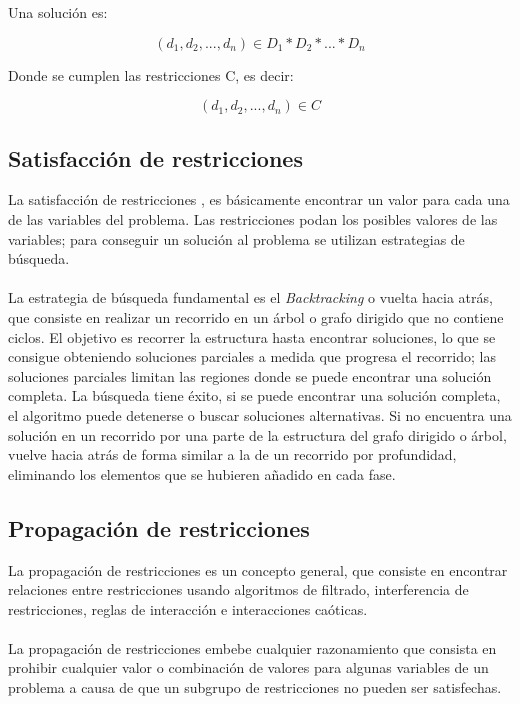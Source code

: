 Una solución es:

$$(d_{1},d_{2},...,d_{n}) \in D_{1}*D_{2}*...*D_{n}$$

Donde se cumplen las restricciones C, es decir:

$$(d_{1},d_{2},...,d_{n}) \in C $$

\subsection{Satisfacci\'on de restricciones}

La satisfacción de restricciones \cite{Francesca}, es básicamente encontrar un valor para cada una de las variables del problema. Las restricciones podan los posibles valores de las variables; para conseguir un solución al problema se utilizan estrategias de búsqueda.
\\ \\
La estrategia de búsqueda fundamental es el \textit{Backtracking} o vuelta hacia atrás, que consiste en realizar un recorrido en un árbol o grafo dirigido que no contiene ciclos. El objetivo es recorrer la estructura hasta encontrar soluciones, lo que se consigue obteniendo soluciones parciales a medida que progresa el recorrido; las soluciones parciales limitan las regiones donde se puede encontrar una solución completa. La búsqueda tiene éxito, si se puede encontrar una solución completa, el algoritmo puede detenerse o buscar soluciones alternativas. Si no encuentra una solución en un recorrido por una parte de la estructura del grafo dirigido o árbol, vuelve hacia atrás de forma similar a la de un recorrido por profundidad, eliminando los elementos que se hubieren añadido en cada fase.

\subsection{Propagaci\'on de restricciones}

La propagación de restricciones \cite{Krzysztof} es un concepto general, que consiste en encontrar relaciones entre restricciones usando algoritmos de filtrado, interferencia de restricciones, reglas de interacción e interacciones caóticas. 
\\ \\
La propagación de restricciones embebe cualquier razonamiento que consista en prohibir cualquier valor o combinación de valores para algunas variables de un problema a causa de que un subgrupo de restricciones no pueden ser satisfechas.

